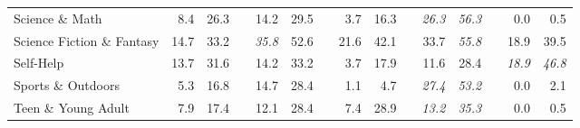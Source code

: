 \documentclass[12pt]{article}
\numberwithin{equation}{section}
\numberwithin{figure}{section}
\begin{document}
\begin{table}[]
{\begin{tabular}{lrrrrrrrrrrrrrr}
	Science \& Math                & 8.4                                & 26.3                               &                               & 14.2                               & 29.5                               &                               & 3.7                                & 16.3                               &                               & \textit{26.3}                      & \textit{56.3}                      &                               & 0.0                                & 0.5                                \\
	Science Fiction \& Fantasy     & 14.7                               & 33.2                               &                               & \textit{35.8}                      & 52.6                               &                               & 21.6                               & 42.1                               &                               & 33.7                               & \textit{55.8}                      &                               & 18.9                               & 39.5                               \\
	Self-Help                      & 13.7                               & 31.6                               &                               & 14.2                               & 33.2                               &                               & 3.7                                & 17.9                               &                               & 11.6                               & 28.4                               &                               & \textit{18.9}                      & \textit{46.8}                      \\
	Sports \& Outdoors             & 5.3                                & 16.8                               &                               & 14.7                               & 28.4                               &                               & 1.1                                & 4.7                                &                               & \textit{27.4}                      & \textit{53.2}                      &                               & 0.0                                & 2.1                                \\
	Teen \& Young Adult            & 7.9                                & 17.4                               &                               & 12.1                               & 28.4                               &                               & 7.4                                & 28.9                               &                               & \textit{13.2}                      & \textit{35.3}                      &                               & 0.0                                & 0.5                                \\

\end{tabular}}
\end{table}
\end{document}
